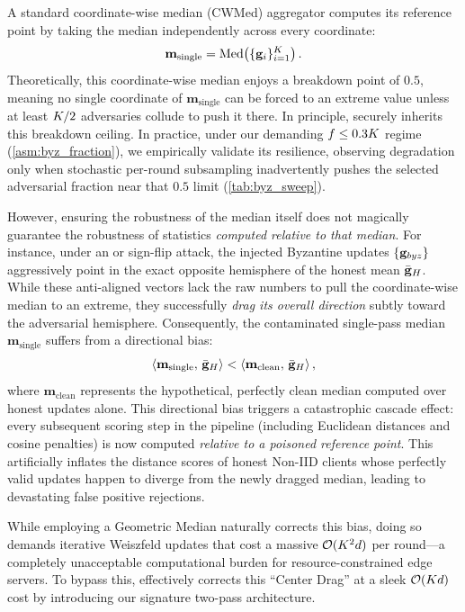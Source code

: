\documentclass[../main.tex]{subfiles}
\begin{document}
A standard coordinate-wise median (CWMed) aggregator computes its reference point by taking the median independently across every coordinate:
\begin{equation}
    \mathbf{m}_{\text{single}} = \operatorname{Med}\!\left(\{\mathbf{g}_{i}\}_{i=1}^{K}\right).
    \label{eq:single_pass_median}
\end{equation}
Theoretically, this coordinate-wise median enjoys a breakdown point of $0.5$, meaning no single coordinate of $\mathbf{m}_{\text{single}}$ can be forced to an extreme value unless at least $K/2$ adversaries collude to push it there. In principle, \aegis{} securely inherits this breakdown ceiling. In practice, under our demanding $f \leq 0.3K$ regime (\cref{asm:byz_fraction}), we empirically validate its resilience, observing degradation only when stochastic per-round subsampling inadvertently pushes the selected adversarial fraction near that $0.5$ limit (\cref{tab:byz_sweep}).

However, ensuring the robustness of the median itself does not magically guarantee the robustness of statistics \emph{computed relative to that median}. For instance, under an \ipm{} or sign-flip attack, the injected Byzantine updates $\{\mathbf{g}_{byz}\}$ aggressively point in the exact opposite hemisphere of the honest mean $\bar{\mathbf{g}}_{H}$. While these anti-aligned vectors lack the raw numbers to pull the coordinate-wise median to an extreme, they successfully \emph{drag its overall direction} subtly toward the adversarial hemisphere. Consequently, the contaminated single-pass median $\mathbf{m}_{\text{single}}$ suffers from a directional bias:
\begin{equation}
    \left\langle \mathbf{m}_{\text{single}},\, \bar{\mathbf{g}}_{H} \right\rangle < \left\langle \mathbf{m}_{\text{clean}},\, \bar{\mathbf{g}}_{H} \right\rangle,
    \label{eq:center_drag}
\end{equation}
where $\mathbf{m}_{\text{clean}}$ represents the hypothetical, perfectly clean median computed over honest updates alone. This directional bias triggers a catastrophic cascade effect: every subsequent scoring step in the pipeline (including Euclidean distances and cosine penalties) is now computed \emph{relative to a poisoned reference point}. This artificially inflates the distance scores of honest Non-IID clients whose perfectly valid updates happen to diverge from the newly dragged median, leading to devastating false positive rejections.

While employing a Geometric Median \citep{chen2017distributed} naturally corrects this bias, doing so demands iterative Weiszfeld updates that cost a massive $\mathcal{O}(K^2 d)$ per round---a completely unacceptable computational burden for resource-constrained edge servers. To bypass this, \aegis{} effectively corrects this ``Center Drag'' at a sleek $\mathcal{O}(K d)$ cost by introducing our signature two-pass architecture.
\end{document}
